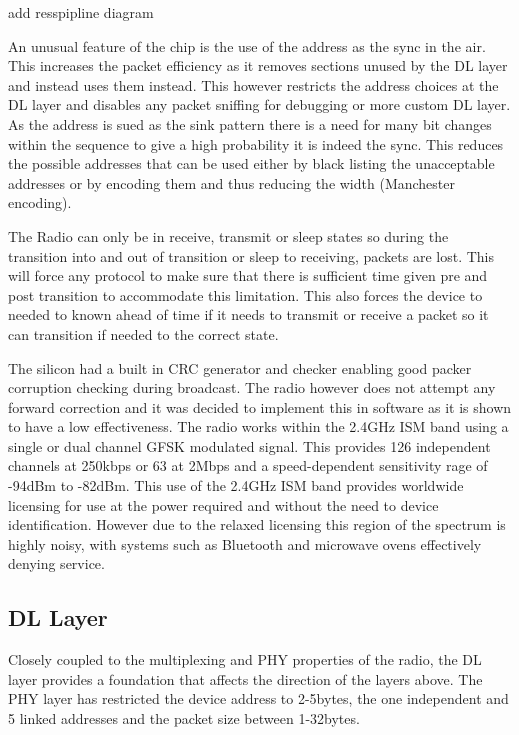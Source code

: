{add resspipline diagram}


An unusual feature of the chip is the use of the address as the sync in the air. This increases the
packet efficiency as it removes sections unused by the \ac{DL} layer and instead uses them instead. This
however restricts the address choices at the DL layer and disables any packet sniffing for debugging
or more custom \ac{DL} layer. As the address is sued as the sink pattern there is a need for many bit
changes within the sequence to give a high probability it is indeed the sync. This reduces the possible
addresses that can be used either by black listing the unacceptable addresses or by encoding them
and thus reducing the width (\eg Manchester encoding).


The Radio can only be in receive, transmit or sleep states so during the transition into and out of
transition or sleep to receiving, packets are lost. This will force any protocol to make sure that there
is sufficient time given pre and post transition to accommodate this limitation. This also forces the
device to needed to known ahead of time if it needs to transmit or receive a packet so it can
transition if needed to the correct state.


The silicon had a built in \ac{CRC} generator and checker enabling good packer corruption checking
during broadcast. The radio however does not attempt any forward correction and it was decided to
implement this in software as it is shown to have a low effectiveness\cite{NetworkDesign1998}.
The radio works within the 2.4GHz ISM band using a single or dual channel \ac{GFSK} modulated signal.
This provides 126 independent channels at 250kbps or 63 at 2Mbps and a speed-dependent
sensitivity rage of -94dBm to -82dBm. This use of the 2.4GHz ISM band provides worldwide licensing
for use at the power required and without the need to device identification. However due to the
relaxed licensing this region of the spectrum is highly noisy, with systems such as Bluetooth and
microwave ovens effectively denying service.

\subsection{\acf{DL} Layer}
Closely coupled to the multiplexing and \ac{PHY} properties of the radio, the \ac{DL} layer provides
a foundation that affects the direction of the layers above. The PHY layer has restricted the device
address to 2-5bytes, the one independent and 5 linked addresses and the packet size between 1-32bytes.


